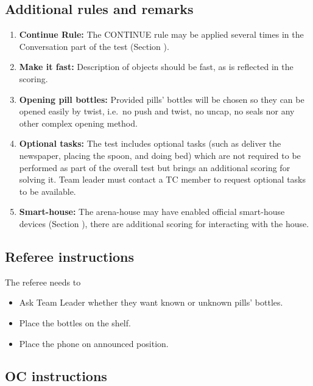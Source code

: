 \subsection{Additional rules and remarks}
\begin{enumerate}
	\item \textbf{Continue Rule:} The CONTINUE rule may be applied several times in the Conversation part of the test (Section ).

	\item \textbf{Make it fast:} Description of objects should be fast, as is reflected in the scoring.
	
	\item \textbf{Opening pill bottles:} Provided pills' bottles will be chosen so they can be opened easily by twist, i.e.~no push and twist, no uncap, no seals nor any other complex opening method.

	\item \textbf{Optional tasks:} The test includes optional tasks (such as deliver the newspaper, placing the spoon, and doing bed) which are not required to be performed as part of the overall test but brings an additional scoring for solving it. Team leader must contact a TC member to request optional tasks to be available.

	\item \textbf{Smart-house:} The arena-house may have enabled official smart-house devices (Section ), there are additional scoring for interacting with the house.
\end{enumerate}

\subsection{Referee instructions}

The referee needs to
\begin{itemize}
	\item Ask Team Leader whether they want known or unknown pills' bottles.
	\item Place the bottles on the shelf.
	\item Place the phone on announced position.
\end{itemize}

\subsection{OC instructions}

